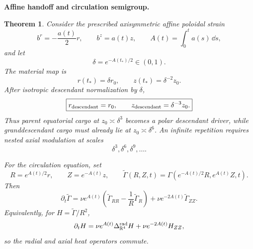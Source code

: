 \documentclass[11pt]{article}
\newtheorem{theorem}{Theorem}[section]
\theoremstyle{definition}\newtheorem{definition}[theorem]{Definition}
\theoremstyle{remark}\newtheorem{remark}[theorem]{Remark}
\begin{document}
\medskip
\noindent\textbf{Affine handoff and circulation semigroup.}
\begin{theorem}\label{thm:affinehandoff}
Consider the prescribed axisymmetric affine poloidal strain
\[
b^r=-\frac{a(t)}2r,\qquad b^z=a(t)z,\qquad
A(t)=\int_0^t a(s)\,\dd s,
\]
and let
\[
\delta=e^{-A(t_*)/2}\in(0,1).
\]
The material map is
\[
r(t_*)=\delta r_0,\qquad z(t_*)=\delta^{-2}z_0.
\]
After isotropic descendant normalization by \(\delta\),
\[
\boxed{r_{\rm descendant}=r_0,\qquad z_{\rm descendant}=\delta^{-3}z_0.}
\]
Thus parent equatorial cargo at \(z_0\asymp\delta^3\) becomes a polar descendant
driver, while granddescendant cargo must already lie at
\(z_0\asymp\delta^6\).  An infinite repetition requires nested axial
modulation at scales
\[
\delta^3,\delta^6,\delta^9,\ldots.
\]

For the circulation equation, set
\[
R=e^{A(t)/2}r,\qquad Z=e^{-A(t)}z,\qquad
\widetilde\Gamma(R,Z,t)=\Gamma(e^{-A(t)/2}R,e^{A(t)}Z,t).
\]
Then
\[
\partial_t\widetilde\Gamma
=
\nu e^{A(t)}
\left(
\widetilde\Gamma_{RR}-\frac1R\widetilde\Gamma_R
\right)
+
\nu e^{-2A(t)}\widetilde\Gamma_{ZZ}.
\]
Equivalently, for \(H=\widetilde\Gamma/R^2\),
\[
\partial_tH
=
\nu e^{A(t)}\Delta_{\mathbb R^4}^{\rm rad}H
+
\nu e^{-2A(t)}H_{ZZ},
\]
so the radial and axial heat operators commute.
\end{theorem}
\end{document}
